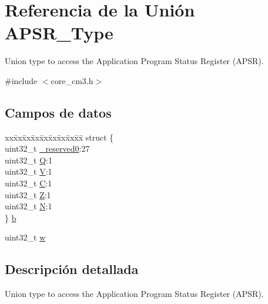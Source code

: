 \hypertarget{union_a_p_s_r___type}{}\section{Referencia de la Unión A\+P\+S\+R\+\_\+\+Type}
\label{union_a_p_s_r___type}


Union type to access the Application Program Status Register (A\+P\+SR).  




{\ttfamily \#include $<$core\+\_\+cm3.\+h$>$}

\subsection*{Campos de datos}
\begin{DoxyCompactItemize}
\item 
\begin{tabbing}
xx\=xx\=xx\=xx\=xx\=xx\=xx\=xx\=xx\=\kill
struct \{\\
\>uint32\_t \mbox{\hyperlink{union_a_p_s_r___type_ac8a6a13838a897c8d0b8bc991bbaf7c1}{\_reserved0}}:27\\
\>uint32\_t \mbox{\hyperlink{union_a_p_s_r___type_a65f27ddc4f7e09c14ce7c5211b2e000a}{Q}}:1\\
\>uint32\_t \mbox{\hyperlink{union_a_p_s_r___type_acd4a2b64faee91e4a9eef300667fa222}{V}}:1\\
\>uint32\_t \mbox{\hyperlink{union_a_p_s_r___type_a7a1caf92f32fe9ebd8d1fe89b06c7776}{C}}:1\\
\>uint32\_t \mbox{\hyperlink{union_a_p_s_r___type_a5ae954cbd9986cd64625d7fa00943c8e}{Z}}:1\\
\>uint32\_t \mbox{\hyperlink{union_a_p_s_r___type_abae0610bc2a97bbf7f689e953e0b451f}{N}}:1\\
\} \mbox{\hyperlink{union_a_p_s_r___type_a2e5b85cff450c7f92c7388dd09f10065}{b}}\\

\end{tabbing}\item 
uint32\+\_\+t \mbox{\hyperlink{union_a_p_s_r___type_ad0fb62e7a08e70fc5e0a76b67809f84b}{w}}
\end{DoxyCompactItemize}


\subsection{Descripción detallada}
Union type to access the Application Program Status Register (A\+P\+SR). 

